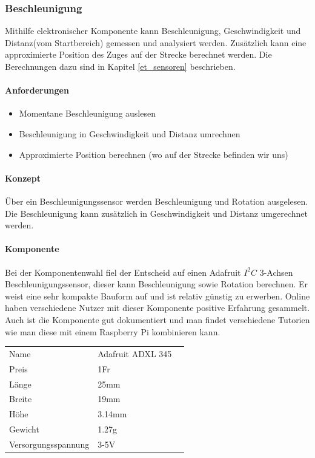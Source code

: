 \documentclass[../../main.tex]{subfiles}
\begin{document}
\subsubsection{Beschleunigung} \label{pi_beschleunigung}
Mithilfe elektronischer Komponente kann Beschleunigung, Geschwindigkeit und Distanz(vom Startbereich) gemessen und analysiert werden. Zusätzlich kann eine approximierte Position des Zuges auf der Strecke berechnet werden. Die Berechnungen dazu sind in Kapitel \ref{et_sensoren} beschrieben.

\paragraph{Anforderungen}
\begin{itemize}
    \item Momentane Beschleunigung auslesen
    \item Beschleunigung in Geschwindigkeit und Distanz umrechnen
    \item Approximierte Position berechnen (wo auf der Strecke befinden wir uns)
\end{itemize}

\paragraph{Konzept}
Über ein Beschleunigungssensor werden Beschleunigung und Rotation ausgelesen. Die Beschleunigung kann zusätzlich in Geschwindigkeit und Distanz umgerechnet werden.

\paragraph{Komponente}
Bei der Komponentenwahl fiel der Entscheid auf einen Adafruit $I^2C$ 3-Achsen Beschleunigungssensor, dieser kann Beschleunigung sowie Rotation berechnen. Er weist eine sehr kompakte Bauform auf und ist relativ günstig zu erwerben. Online haben verschiedene Nutzer mit dieser Komponente positive Erfahrung gesammelt. Auch ist die Komponente gut dokumentiert und man findet verschiedene Tutorien wie man diese mit einem Raspberry Pi kombinieren kann.

\begin{table}[] \centering
\begin{tabular}{lll}
Name & Adafruit ADXL 345 \\
Preis & 1Fr    \\
Länge & 25mm    \\
Breite & 19mm   \\
Höhe & 3.14mm      \\
Gewicht & 1.27g   \\
Versorgungsspannung & 3-5V \\
\end{tabular}
\end{table}
\end{document}
